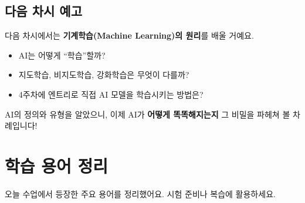 \documentclass[11pt,a4paper]{article}
\begin{document}
\subsection{ 다음 차시 예고}

다음 차시에서는 \textbf{기계학습(Machine Learning)의 원리}를 배울 거예요.

\begin{itemize}[leftmargin=*]
    \item AI는 어떻게 ``학습''할까?
    \item 지도학습, 비지도학습, 강화학습은 무엇이 다를까?
    \item 4주차에 엔트리로 직접 AI 모델을 학습시키는 방법은?
\end{itemize}

AI의 정의와 유형을 알았으니, 이제 AI가 \textbf{어떻게 똑똑해지는지} 그 비밀을 파헤쳐 볼 차례입니다!

\newpage

\section{ 학습 용어 정리}

오늘 수업에서 등장한 주요 용어를 정리했어요. 시험 준비나 복습에 활용하세요.
\end{document}
